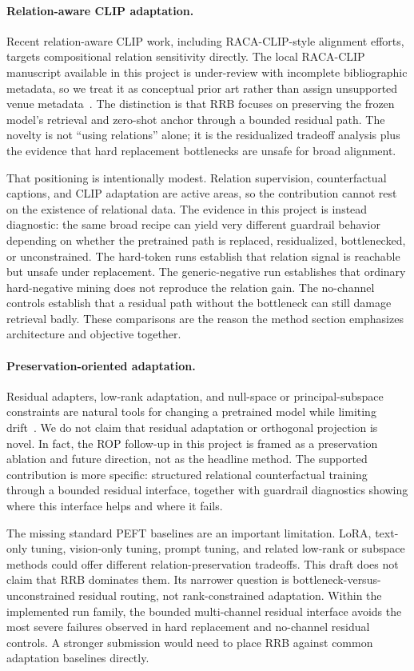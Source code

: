 \paragraph{Relation-aware CLIP adaptation.}
Recent relation-aware CLIP work, including RACA-CLIP-style alignment efforts, targets compositional relation sensitivity directly. The local RACA-CLIP manuscript available in this project is under-review with incomplete bibliographic metadata, so we treat it as conceptual prior art rather than assign unsupported venue metadata~\cite{raca2026local}. The distinction is that RRB focuses on preserving the frozen model's retrieval and zero-shot anchor through a bounded residual path. The novelty is not ``using relations'' alone; it is the residualized tradeoff analysis plus the evidence that hard replacement bottlenecks are unsafe for broad alignment.

That positioning is intentionally modest. Relation supervision, counterfactual captions, and CLIP adaptation are active areas, so the contribution cannot rest on the existence of relational data. The evidence in this project is instead diagnostic: the same broad recipe can yield very different guardrail behavior depending on whether the pretrained path is replaced, residualized, bottlenecked, or unconstrained. The hard-token runs establish that relation signal is reachable but unsafe under replacement. The generic-negative run establishes that ordinary hard-negative mining does not reproduce the relation gain. The no-channel controls establish that a residual path without the bottleneck can still damage retrieval badly. These comparisons are the reason the method section emphasizes architecture and objective together.

\paragraph{Preservation-oriented adaptation.}
Residual adapters, low-rank adaptation, and null-space or principal-subspace constraints are natural tools for changing a pretrained model while limiting drift~\cite{hu2022lora,peng2025gnsp,luo2026keeplora,qiao2024pegp,wu2026psoft,lu2024vptnullspace}. We do not claim that residual adaptation or orthogonal projection is novel. In fact, the ROP follow-up in this project is framed as a preservation ablation and future direction, not as the headline method. The supported contribution is more specific: structured relational counterfactual training through a bounded residual interface, together with guardrail diagnostics showing where this interface helps and where it fails.

The missing standard PEFT baselines are an important limitation. LoRA, text-only tuning, vision-only tuning, prompt tuning, and related low-rank or subspace methods could offer different relation-preservation tradeoffs. This draft does not claim that RRB dominates them. Its narrower question is bottleneck-versus-unconstrained residual routing, not rank-constrained adaptation. Within the implemented run family, the bounded multi-channel residual interface avoids the most severe failures observed in hard replacement and no-channel residual controls. A stronger submission would need to place RRB against common adaptation baselines directly.
